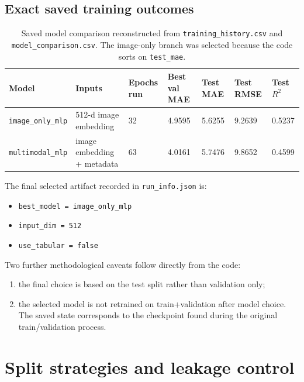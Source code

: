 \documentclass[11pt]{article}
\begin{document}
\subsection{Exact saved training outcomes}

\begin{table}[H]
\centering
\small
\begin{tabularx}{\textwidth}{p{} p{} p{} p{} p{} p{} p{}}
\toprule
\textbf{Model} & \textbf{Inputs} & \textbf{Epochs run} & \textbf{Best val MAE} & \textbf{Test MAE} & \textbf{Test RMSE} & \textbf{Test \(R^2\)} \\
\midrule
\texttt{image\_only\_mlp} & 512-d image embedding & 32 & 4.9595 & 5.6255 & 9.2639 & 0.5237 \\
\texttt{multimodal\_mlp} & image embedding + metadata & 63 & 4.0161 & 5.7476 & 9.8652 & 0.4599 \\
\bottomrule
\end{tabularx}
\caption{Saved model comparison reconstructed from \texttt{training\_history.csv} and \texttt{model\_comparison.csv}. The image-only branch was selected because the code sorts on \texttt{test\_mae}.}
\label{tab:model_comparison}
\end{table}

The final selected artifact recorded in \texttt{run\_info.json} is:
\begin{itemize}
  \item \texttt{best\_model = image\_only\_mlp}
  \item \texttt{input\_dim = 512}
  \item \texttt{use\_tabular = false}
\end{itemize}

Two further methodological caveats follow directly from the code:
\begin{enumerate}
  \item the final choice is based on the test split rather than validation only;
  \item the selected model is not retrained on train+validation after model choice. The saved state corresponds to the checkpoint found during the original train/validation process.
\end{enumerate}

\section{Split strategies and leakage control}
\end{document}
